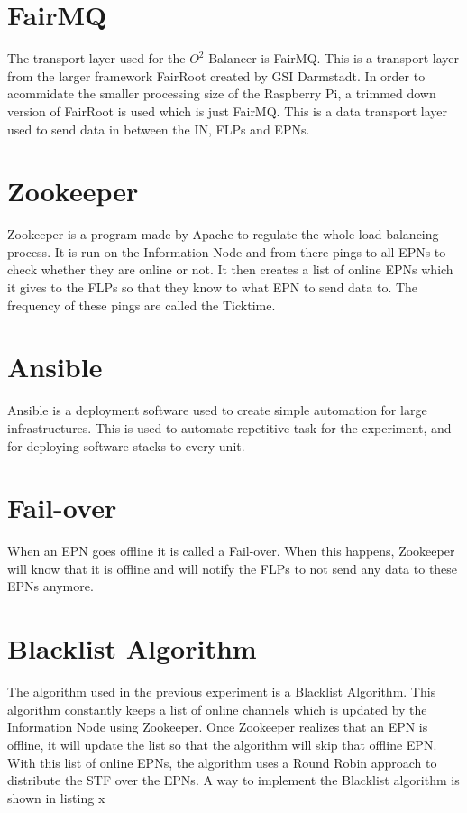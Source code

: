 \section{FairMQ}
The transport layer used for the $O^2$ Balancer is FairMQ. This is a transport layer from the larger framework FairRoot created by GSI Darmstadt. In order to acommidate the smaller processing size of the Raspberry Pi, a trimmed down version of FairRoot is used which is just FairMQ. This is a data transport layer used to send data in between the IN, FLPs and EPNs.

\section{Zookeeper}
Zookeeper is a program made by Apache to regulate the whole load balancing process. It is run on the Information Node and from there pings to all EPNs to check whether they are online or not. It then creates a list of online EPNs which it gives to the FLPs so that they know to what EPN to send data to. The frequency of these pings are called the Ticktime.

\section{Ansible}
Ansible is a deployment software used to create simple automation for large infrastructures. This is used to automate repetitive task for the experiment, and for deploying software stacks to every unit. 

\section{Fail-over}
When an EPN goes offline it is called a Fail-over. When this happens, Zookeeper will know that it is offline and will notify the FLPs to not send any data to these EPNs anymore.

\section{Blacklist Algorithm}
The algorithm used in the previous experiment is a Blacklist Algorithm. This algorithm constantly keeps a list of online channels which is updated by the Information Node using Zookeeper. Once Zookeeper realizes that an EPN is offline, it will update the list so that the algorithm will skip that offline EPN. With this list of online EPNs, the algorithm uses a Round Robin approach to distribute the STF over the EPNs. A way to implement the Blacklist algorithm is shown in listing x